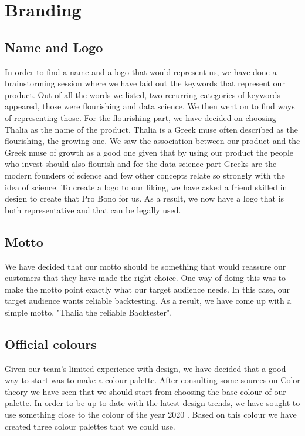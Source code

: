 \documentclass[main.tex]{subfiles}
\begin{document}
\section{Branding}

\subsection{Name and Logo}
In order to find a name and a logo that would represent us, we have done a brainstorming session where we have laid out the keywords that represent our product. Out of all the words we listed, two recurring categories of keywords appeared, those were flourishing and data science. We then went on to find ways of representing those. For the flourishing part, we have decided on choosing Thalia as the name of the product. Thalia is a Greek muse often described as the flourishing, the growing one. We saw the association between our product and the Greek muse of growth as a good one given that by using our product the people who invest should also flourish and for the data science part  Greeks are the modern founders of science and few other concepts relate so strongly with the idea of science. \newline\newline
To create a logo to our liking, we have asked a friend skilled in design to create that Pro Bono for us. As a result, we now have a logo that is both representative and that can be legally used.

\subsection{Motto}
We have decided that our motto should be something that would reassure our customers that they have made the right choice. One way of doing this was to make the motto point exactly what our target audience needs. In this case, our target audience wants reliable backtesting. As a result, we have come up with a simple motto, "Thalia the reliable Backtester".



\subsection{Official colours} 
Given our team's limited experience with design, we have decided that a good way to start was to make a colour palette. After consulting some sources on Color theory \cite{how_to_color_palette} we have seen that we should start from choosing the base colour of our palette. In order to be up to date with the latest design trends, we have sought to use something close to the colour of the year 2020 \cite{pantone}. Based on this colour we have created three colour palettes that we could use.
\end{document}
